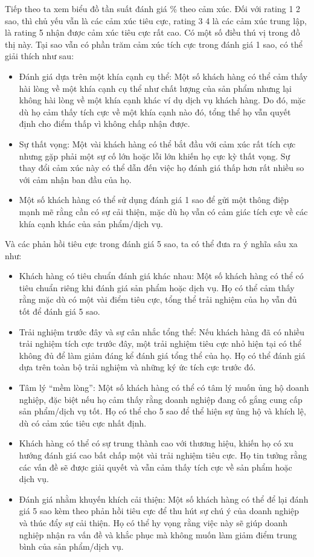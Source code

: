 Tiếp theo ta xem biểu đồ tần suất đánh giá \% theo cảm xúc. Đối với rating 1 2 sao, thì chủ yếu vẫn là các cảm xúc tiêu cực, rating 3 4 là các cảm xúc trung lập, là rating 5 nhận được cảm xúc tiêu cực rất cao. Có một số điều thú vị trong đồ thị này. Tại sao vẫn có phần trăm cảm xúc tích cực trong đánh giá 1 sao, có thể giải thích như sau:
\begin{itemize}
    \item Đánh giá dựa trên một khía cạnh cụ thể: Một số khách hàng có thể cảm thấy hài lòng về một khía cạnh cụ thể như chất lượng của sản phẩm nhưng lại không hài lòng về một khía cạnh khác ví dụ dịch vụ khách hàng. Do đó, mặc dù họ cảm thấy tích cực về một khía cạnh nào đó, tổng thể họ vẫn quyết định cho điểm thấp vì không chấp nhận được.
    \item Sự thất vọng: Một vài khách hàng có thể bắt đầu với cảm xúc rất tích cực nhưng gặp phải một sự cố lớn hoặc lỗi lớn khiến họ cực kỳ thất vọng. Sự thay đổi cảm xúc này có thể dẫn đến việc họ đánh giá thấp hơn rất nhiều so với cảm nhận ban đầu của họ.
    \item Một số khách hàng có thể sử dụng đánh giá 1 sao để gửi một thông điệp mạnh mẽ rằng cần có sự cải thiện, mặc dù họ vẫn có cảm giác tích cực về các khía cạnh khác của sản phẩm/dịch vụ.
\end{itemize} 
Và các phản hồi tiêu cực trong đánh giá 5 sao, ta có thể đưa ra ý nghĩa sâu xa như:
\begin{itemize}
    \item Khách hàng có tiêu chuẩn đánh giá khác nhau: Một số khách hàng có thể có tiêu chuẩn riêng khi đánh giá sản phẩm hoặc dịch vụ. Họ có thể cảm thấy rằng mặc dù có một vài điểm tiêu cực, tổng thể trải nghiệm của họ vẫn đủ tốt để đánh giá 5 sao.
    \item Trải nghiệm trước đây và sự cân nhắc tổng thể: Nếu khách hàng đã có nhiều trải nghiệm tích cực trước đây, một trải nghiệm tiêu cực nhỏ hiện tại có thể không đủ để làm giảm đáng kể đánh giá tổng thể của họ. Họ có thể đánh giá dựa trên toàn bộ trải nghiệm và những ký ức tích cực trước đó.
    \item Tâm lý “mềm lòng”: Một số khách hàng có thể có tâm lý muốn ủng hộ doanh nghiệp, đặc biệt nếu họ cảm thấy rằng doanh nghiệp đang cố gắng cung cấp sản phẩm/dịch vụ tốt. Họ có thể cho 5 sao để thể hiện sự ủng hộ và khích lệ, dù có cảm xúc tiêu cực nhất định.
    \item Khách hàng có thể có sự trung thành cao với thương hiệu, khiến họ có xu hướng đánh giá cao bất chấp một vài trải nghiệm tiêu cực. Họ tin tưởng rằng các vấn đề sẽ được giải quyết và vẫn cảm thấy tích cực về sản phẩm hoặc dịch vụ.
    \item Đánh giá nhằm khuyến khích cải thiện: Một số khách hàng có thể để lại đánh giá 5 sao kèm theo phản hồi tiêu cực để thu hút sự chú ý của doanh nghiệp và thúc đẩy sự cải thiện. Họ có thể hy vọng rằng việc này sẽ giúp doanh nghiệp nhận ra vấn đề và khắc phục mà không muốn làm giảm điểm trung bình của sản phẩm/dịch vụ.
\end{itemize}


